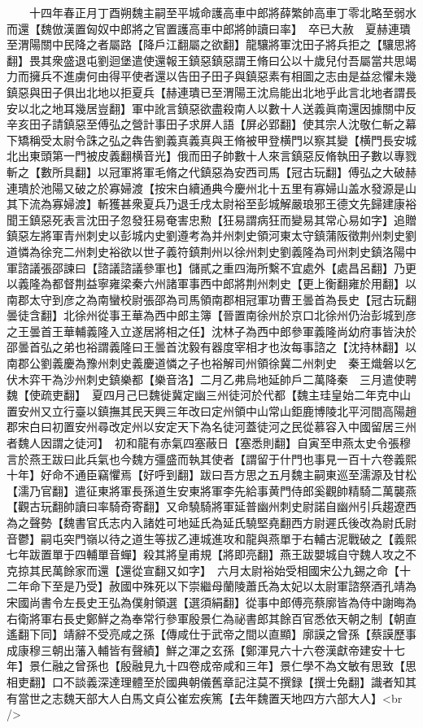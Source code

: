 　　十四年春正月丁酉朔魏主嗣至平城命護高車中郎將薛繁帥高車丁零北略至弱水而還【魏倣漢置匈奴中郎將之官置護高車中郎將帥讀曰率】　卒已大赦　夏赫連璝至渭陽關中民降之者屬路【降戶江翻屬之欲翻】龍驤將軍沈田子將兵拒之【驤思將翻】畏其衆盛退屯劉迴堡遣使還報王鎮惡鎮惡謂王脩曰公以十歲兒付吾屬當共思竭力而擁兵不進虜何由得平使者還以告田子田子與鎮惡素有相圖之志由是益忿懼未幾鎮惡與田子俱出北地以拒夏兵【赫連璝已至渭陽王沈烏能出北地乎此言北地者謂長安以北之地耳幾居豈翻】軍中訛言鎮惡欲盡殺南人以數十人送義眞南還因據關中反辛亥田子請鎮惡至傅弘之營計事田子求屏人語【屏必郢翻】使其宗人沈敬仁斬之幕下矯稱受太尉令誅之弘之犇告劉義真義真與王脩被甲登横門以察其變【横門長安城北出東頭第一門被皮義翻横音光】俄而田子帥數十人來言鎮惡反脩執田子數以專戮斬之【數所具翻】以冠軍將軍毛脩之代鎮惡為安西司馬【冠古玩翻】傅弘之大破赫連璝於池陽又破之於寡婦渡【按宋白續通典今慶州北十五里有寡婦山盖水發源是山其下流為寡婦渡】斬獲甚衆夏兵乃退壬戌太尉裕至彭城解嚴琅邪王德文先歸建康裕聞王鎮惡死表言沈田子忽發狂易奄害忠勲【狂易謂病狂而變易其常心易如字】追贈鎮惡左將軍青州刺史以彭城内史劉遵考為并州刺史領河東太守鎮蒲阪徵荆州刺史劉道憐為徐兖二州刺史裕欲以世子義符鎮荆州以徐州刺史劉義隆為司州刺史鎮洛陽中軍諮議張邵諫曰【諮議諮議參軍也】儲貳之重四海所繫不宜處外【處昌呂翻】乃更以義隆為都督荆益寧雍梁秦六州諸軍事西中郎將荆州刺史【更上衡翻雍於用翻】以南郡太守到彦之為南蠻校尉張邵為司馬領南郡相冠軍功曹王曇首為長史【冠古玩翻曇徒含翻】北徐州從事王華為西中郎主簿【晉置南徐州於京口北徐州仍治彭城到彦之王曇首王華輔義隆入立遂居將相之任】沈林子為西中郎參軍義隆尚幼府事皆決於邵曇首弘之弟也裕謂義隆曰王曇首沈毅有器度宰相才也汝每事諮之【沈持林翻】以南郡公劉義慶為豫州刺史義慶道憐之子也裕解司州領徐冀二州刺史　秦王熾磐以乞伏木弈干為沙州刺史鎮樂都【樂音洛】二月乙弗烏地延帥戶二萬降秦　三月遣使聘魏【使疏吏翻】　夏四月己巳魏徙冀定幽三州徒河於代都【魏主珪皇始二年克中山置安州又立行臺以鎮撫其民天興三年改曰定州領中山常山鉅鹿博陵北平河間高陽趙郡宋白曰初置安州尋改定州以安定天下為名徒河蓋徒河之民從慕容入中國留居三州者魏人因謂之徒河】　初和龍有赤氣四塞蔽日【塞悉則翻】自寅至申燕太史令張穆言於燕王跋曰此兵氣也今魏方彊盛而執其使者【謂留于什門也事見一百十六卷義熙十年】好命不通臣竊懼焉【好呼到翻】跋曰吾方思之五月魏主嗣東巡至濡源及甘松【濡乃官翻】遣征東將軍長孫道生安東將軍李先給事黄門侍郎奚觀帥精騎二萬襲燕【觀古玩翻帥讀曰率騎奇寄翻】又命驍騎將軍延普幽州刺史尉諾自幽州引兵趨遼西為之聲勢【魏書官氏志内入諸姓可地延氏為延氏驍堅堯翻西方尉遲氏後改為尉氏尉音鬱】嗣屯突門嶺以待之道生等拔乙連城進攻和龍與燕單于右輔古泥戰破之【義熙七年跋置單于四輔單音蟬】殺其將皇甫規【將即亮翻】燕王跋嬰城自守魏人攻之不克掠其民萬餘家而還【還從宣翻又如字】　六月太尉裕始受相國宋公九錫之命【十二年命下至是乃受】赦國中殊死以下崇繼母蘭陵蕭氏為太妃以太尉軍諮祭酒孔靖為宋國尚書令左長史王弘為僕射領選【選須絹翻】從事中郎傅亮蔡廓皆為侍中謝晦為右衛將軍右長史鄭鮮之為奉常行參軍殷景仁為祕書郎其餘百官悉依天朝之制【朝直遙翻下同】靖辭不受亮咸之孫【傳咸仕于武帝之間以直顯】廓謨之曾孫【蔡謨歷事成康穆三朝出藩入輔皆有聲績】鮮之渾之玄孫【鄭渾見六十六卷漢獻帝建安十七年】景仁融之曾孫也【殷融見九十四卷成帝咸和三年】景仁學不為文敏有思致【思相吏翻】口不談義深達理體至於國典朝儀舊章記注莫不撰録【撰士免翻】識者知其有當世之志魏天部大人白馬文貞公崔宏疾篤【去年魏置天地四方六部大人】<br />
